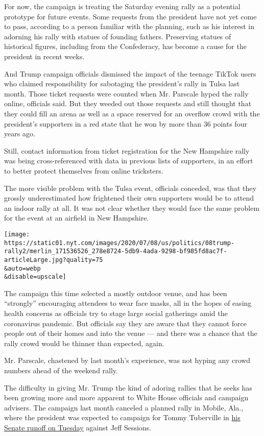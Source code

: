 For now, the campaign is treating the Saturday evening rally as a
potential prototype for future events. Some requests from the president
have not yet come to pass, according to a person familiar with the
planning, such as his interest in adorning his rally with statues of
founding fathers. Preserving statues of historical figures, including
from the Confederacy, has become a cause for the president in recent
weeks.

And Trump campaign officials dismissed the impact of the teenage TikTok
users who claimed responsibility for sabotaging the president's rally in
Tulsa last month. Those ticket requests were counted when Mr. Parscale
hyped the rally online, officials said. But they weeded out those
requests and still thought that they could fill an arena as well as a
space reserved for an overflow crowd with the president's supporters in
a red state that he won by more than 36 points four years ago.

Still, contact information from ticket registration for the New
Hampshire rally was being cross-referenced with data in previous lists
of supporters, in an effort to better protect themselves from online
tricksters.

The more visible problem with the Tulsa event, officials conceded, was
that they grossly underestimated how frightened their own supporters
would be to attend an indoor rally at all. It was not clear whether they
would face the same problem for the event at an airfield in New
Hampshire.

\texttt{[image: https://static01.nyt.com/images/2020/07/08/us/politics/08trump-rally2/merlin\_171536526\_278e8724-5db9-4ada-9298-bf985fd8ac7f-articleLarge.jpg?quality=75\\\&auto=webp\\\&disable=upscale]}

The campaign this time selected a mostly outdoor venue, and has been
``strongly'' encouraging attendees to wear face masks, all in the hopes
of easing health concerns as officials try to stage large social
gatherings amid the coronavirus pandemic. But officials say they are
aware that they cannot force people out of their homes and into the
venue --- and there was a chance that the rally crowd would be thinner
than expected, again.

Mr. Parscale, chastened by last month's experience, was not hyping any
crowd numbers ahead of the weekend rally.

The difficulty in giving Mr. Trump the kind of adoring rallies that he
seeks has been growing more and more apparent to White House officials
and campaign advisers. The campaign last month canceled a planned rally
in Mobile, Ala., where the president was expected to campaign for Tommy
Tuberville in
\href{https://www.nytimes.com/2020/06/30/magazine/jeff-sessions.html}{his
Senate runoff on Tuesday} against Jeff Sessions.

